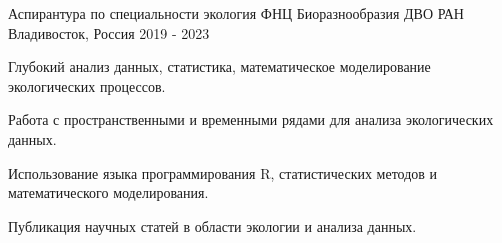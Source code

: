 

\begin{cventries}

  \cventry
    {Аспирантура по специальности экология} %
    {ФНЦ Биоразнообразия ДВО РАН} %
    {Владивосток, Россия} %
    {2019 - 2023} %
    {
      \begin{cvitems} %
        \item {Глубокий анализ данных, статистика, математическое моделирование экологических процессов.}
        \item {Работа с пространственными и временными рядами для анализа экологических данных.}
        \item {Использование языка программирования R, статистических методов и математического моделирования.}
        \item {Публикация научных статей в области экологии и анализа данных.}
      \end{cvitems}
    }

\end{cventries}



